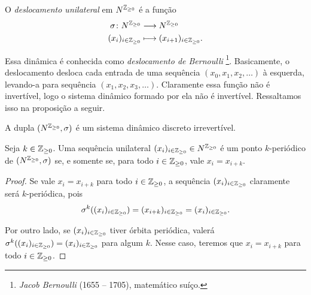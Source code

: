 \begin{definition}
O \emph{deslocamento unilateral} em $N^{\mathbb{Z}_{\geq 0}}$ é a função
	\begin{align*}
	{\sigma}\colon {N^{\mathbb{Z}_{\geq 0}}} &\longrightarrow {N^{\mathbb{Z}_{\geq 0}}} \\{(x_i)_{i \in \mathbb{Z}_{\geq 0}}} &\longmapsto (x_{i+1})_{i \in \mathbb{Z}_{\geq 0}}.
	\end{align*}
\end{definition}

 Essa dinâmica é conhecida como \emph{deslocamento de Bernoulli} \footnote{\emph{Jacob Bernoulli} (1655 -- 1705), matemático suíço.}. Basicamente, o deslocamento desloca cada entrada de uma sequência $(x_0,x_1,x_2,\ldots)$ à esquerda, levando-a para sequência $(x_1,x_2,x_3,\ldots)$. Claramente essa função não é invertível, logo o sistema dinâmico formado por ela não é invertível. Ressaltamos isso na proposição a seguir.

\begin{proposition}
A dupla $(N^{\mathbb{Z}_{\geq 0}},\sigma)$ é um sistema dinâmico discreto irrevertível.
\end{proposition}

\begin{proposition}
Seja $k \in \mathbb{Z}_{\geq 0}$. Uma sequência unilateral $(x_i)_{i \in \mathbb{Z}_{\geq 0}} \in N^{\mathbb{Z}_{\geq 0}}$ é um ponto $k$-periódico de $(N^{\mathbb{Z}_{\geq 0}},\sigma)$  se, e somente se, para todo $i \in \mathbb{Z}_{\geq 0}$, vale $x_i = x_{i+k}$.
\end{proposition}
\begin{proof}
Se vale $x_i = x_{i+k}$ para todo $i \in \mathbb{Z}_{\geq 0}$, a sequência $(x_i)_{i \in \mathbb{Z}_{\geq 0}}$ claramente será $k$-periódica, pois
	\begin{equation*}
	\sigma^k((x_i)_{i \in \mathbb{Z}_{\geq 0}}) = (x_{i+k})_{i \in \mathbb{Z}_{\geq 0}} = (x_i)_{i \in \mathbb{Z}_{\geq 0}}.
	\end{equation*}

Por outro lado, se $(x_i)_{i \in \mathbb{Z}_{\geq 0}}$ tiver órbita periódica, valerá $\sigma^k((x_i)_{i \in \mathbb{Z}_{\geq 0}}) = (x_i)_{i \in \mathbb{Z}_{\geq 0}}$ para algum $k$. Nesse caso, teremos que $x_i = x_{i+k}$ para todo $i \in \mathbb{Z}_{\geq 0}$.
\end{proof}

